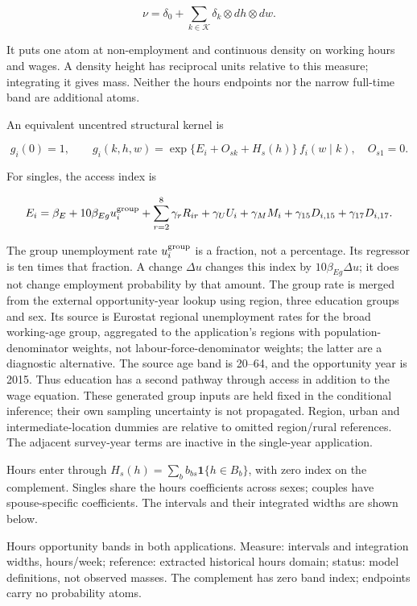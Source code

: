 \documentclass[11pt,a4paper]{article}
\begin{document}
\[\nu=\delta_0+\sum_{k\in\mathcal K}\delta_k\otimes dh\otimes dw.\]

It puts one atom at non-employment and continuous density on working hours and wages. A density height has reciprocal units relative to this measure; integrating it gives mass. Neither the hours endpoints nor the narrow full-time band are additional atoms.

An equivalent uncentred structural kernel is

\[g_i(0)=1,\qquad g_i(k,h,w)=\exp\{E_i+O_{sk}+H_s(h)\}\,f_i(w\mid k),\quad O_{s1}=0.\]

For singles, the access index is

\[E_i=\beta_E+10\beta_{Eg}u_i^{\rm group}+\sum_{r=2}^{8}\gamma_r R_{ir}
+\gamma_U U_i+\gamma_M M_i+\gamma_{15}D_{i,15}+\gamma_{17}D_{i,17}.\]

The group unemployment rate \(u_i^{\rm group}\) is a fraction, not a percentage. Its regressor is ten times that fraction. A change \(\Delta u\) changes this index by \(10\beta_{Eg}\Delta u\); it does not change employment probability by that amount. The group rate is merged from the external opportunity-year lookup using region, three education groups and sex. Its source is Eurostat regional unemployment rates for the broad working-age group, aggregated to the application's regions with population-denominator weights, not labour-force-denominator weights; the latter are a diagnostic alternative. The source age band is 20--64, and the opportunity year is 2015. Thus education has a second pathway through access in addition to the wage equation. These generated group inputs are held fixed in the conditional inference; their own sampling uncertainty is not propagated. Region, urban and intermediate-location dummies are relative to omitted region/rural references. The adjacent survey-year terms are inactive in the single-year application.

Hours enter through \(H_s(h)=\sum_b b_{bs}\mathbf1\{h\in B_b\}\), with zero index on the complement. Singles share the hours coefficients across sexes; couples have spouse-specific coefficients. The intervals and their integrated widths are shown below.

Hours opportunity bands in both applications. Measure: intervals and integration widths, hours/week; reference: extracted historical hours domain; status: model definitions, not observed masses. The complement has zero band index; endpoints carry no probability atoms.
\end{document}
